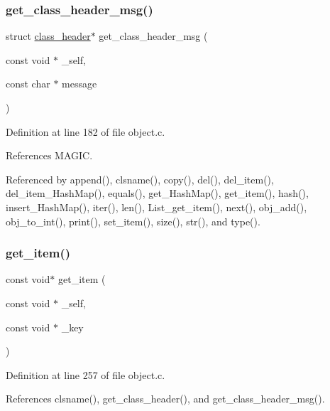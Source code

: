\subsubsection{\texorpdfstring{get\+\_\+class\+\_\+header\+\_\+msg()}{get\_class\_header\_msg()}}
{\footnotesize\ttfamily struct \mbox{\hyperlink{structclass__header}{class\+\_\+header}}$\ast$ get\+\_\+class\+\_\+header\+\_\+msg (\begin{DoxyParamCaption}\item[{const void $\ast$}]{\+\_\+self,  }\item[{const char $\ast$}]{message }\end{DoxyParamCaption})\hspace{0.3cm}{\ttfamily [inline]}}



Definition at line 182 of file object.\+c.



References M\+A\+G\+IC.



Referenced by append(), clsname(), copy(), del(), del\+\_\+item(), del\+\_\+item\+\_\+\+Hash\+Map(), equals(), get\+\_\+\+Hash\+Map(), get\+\_\+item(), hash(), insert\+\_\+\+Hash\+Map(), iter(), len(), List\+\_\+get\+\_\+item(), next(), obj\+\_\+add(), obj\+\_\+to\+\_\+int(), print(), set\+\_\+item(), size(), str(), and type().

\mbox{\label{group__collection_gaa467fc1e6a3036f13ea20b36a6e672a1}} 
\subsubsection{\texorpdfstring{get\+\_\+item()}{get\_item()}}
{\footnotesize\ttfamily const void$\ast$ get\+\_\+item (\begin{DoxyParamCaption}\item[{const void $\ast$}]{\+\_\+self,  }\item[{const void $\ast$}]{\+\_\+key }\end{DoxyParamCaption})}



Definition at line 257 of file object.\+c.



References clsname(), get\+\_\+class\+\_\+header(), and get\+\_\+class\+\_\+header\+\_\+msg().

